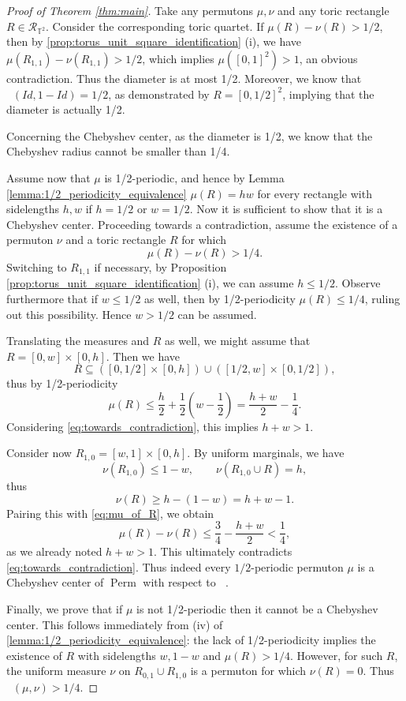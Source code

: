 \documentclass{article}
\newcommand{\Perm}{\mathop{\mathrm{Perm}}}
\newcommand{\ds}{\mathop{d_\square}}
\theoremstyle{definition}
\begin{document}
\begin{proof}[Proof of Theorem \ref{thm:main}]
    Take any permutons $\mu, \nu$ and any toric rectangle $R\in\mathcal{R}_{\mathbb{T}^2}$. Consider the corresponding toric quartet. If $\mu(R)-\nu(R)>1/2$, then by \cref{prop:torus_unit_square_identification} (i), we have $\mu(R_{1, 1})-\nu(R_{1, 1})>1/2$, which implies $\mu([0, 1]^2)>1$, an obvious contradiction. Thus the diameter is at most 1/2. Moreover, we know that $\ds(Id, 1-Id)=1/2$, as demonstrated by $R=[0, 1/2]^2$, implying that the diameter is actually 1/2.

    Concerning the Chebyshev center, as the diameter is 1/2, we know that the Chebyshev radius cannot be smaller than 1/4. 

    Assume now that $\mu$ is 1/2-periodic, and hence by Lemma \ref{lemma:1/2_periodicity_equivalence} $\mu(R)=hw$ for every rectangle with sidelengths $h, w$ if $h=1/2$ or $w=1/2$. Now it is sufficient to show that it is a Chebyshev center. Proceeding towards a contradiction, assume the existence of a permuton $\nu$ and a toric rectangle $R$ for which 
    \begin{equation}\label{eq:towards_contradiction}
    \mu(R)-\nu(R)>1/4.
    \end{equation}
    Switching to $R_{1, 1}$ if necessary, by Proposition \ref{prop:torus_unit_square_identification} (i), we can assume $h\leq 1/2$. Observe furthermore that if $w\leq 1/2$ as well, then by 1/2-periodicity $\mu(R)\leq 1/4$, ruling out this possibility. Hence $w>1/2$ can be assumed.

    Translating the measures and $R$ as well, we might assume that $R=[0, w]\times [0, h]$. Then we have
    $$R\subseteq \left([0, 1/2]\times [0, h]\right)\cup\left([1/2, w]\times [0, 1/2]\right),$$
    thus by 1/2-periodicity
    \begin{equation}\label{eq:mu_of_R}
    \mu(R)\leq \frac{h}{2}+\frac{1}{2}\left(w-\frac{1}{2}\right)=\frac{h+w}{2}-\frac{1}{4}.
    \end{equation}
    Considering \eqref{eq:towards_contradiction}, this implies $h+w> 1$.
    
    Consider now $R_{1, 0}=[w, 1]\times [0, h]$. By uniform marginals, we have
    $$\nu(R_{1, 0})\leq 1-w, \qquad \nu(R_{1, 0}\cup R)=h,$$
    thus
    $$\nu(R)\geq h-(1-w)=h+w-1.$$
    Pairing this with \eqref{eq:mu_of_R}, we obtain
    $$\mu(R)-\nu(R)\leq \frac{3}{4}-\frac{h+w}{2}<\frac{1}{4},$$
    as we already noted $h+w>1$. This ultimately contradicts \eqref{eq:towards_contradiction}. Thus indeed every $1/2$-periodic permuton $\mu$ is a Chebyshev center of $\Perm$ with respect to $\ds$.

    Finally, we prove that if $\mu$ is not 1/2-periodic then it cannot be a Chebyshev center. This follows immediately from (iv) of \cref{lemma:1/2_periodicity_equivalence}: the lack of 1/2-periodicity implies the existence of $R$ with sidelengths $w, 1-w$ and $\mu(R)>1/4$. However, for such $R$, the uniform measure $\nu$ on $R_{0, 1}\cup R_{1, 0}$ is a permuton for which $\nu(R)=0$. Thus $\ds(\mu, \nu)>1/4$.

\end{proof}
\end{document}
